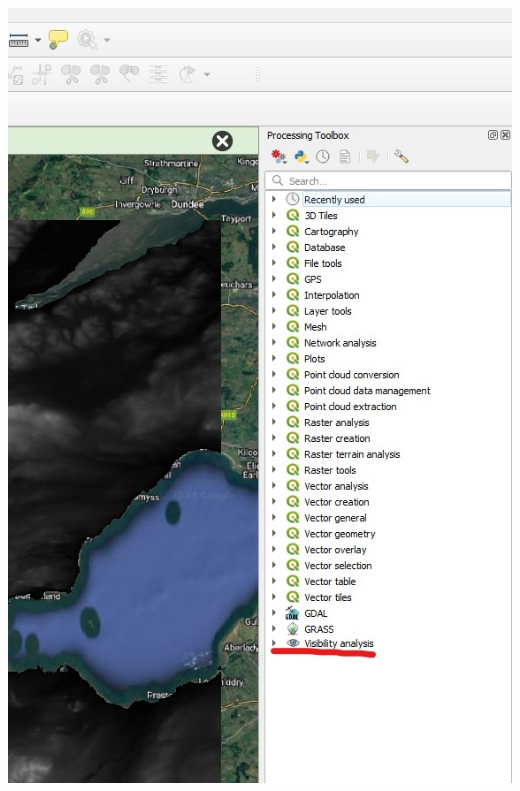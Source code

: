\documentclass[
  letterpaper,
  DIV=11,
  numbers=noendperiod]{scrreprt}
\begin{document}
\includegraphics{images/lab_5/lab5_fig7_proc.jpg}
\end{document}
